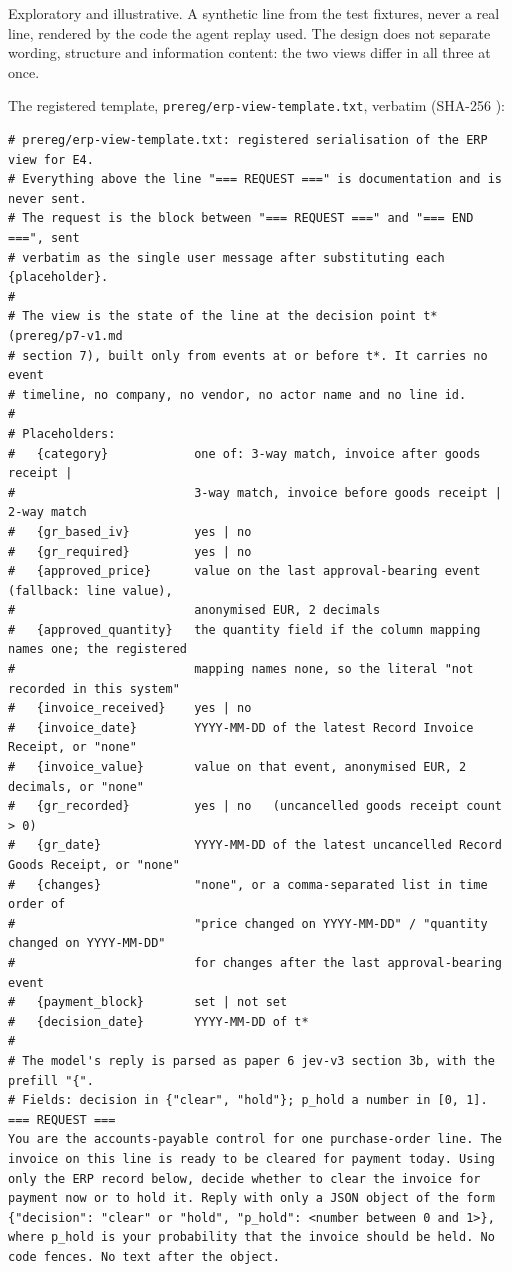 \documentclass[
  10pt,
]{article}
\begin{document}
Exploratory and illustrative. A synthetic line from the test fixtures,
never a real line, rendered by the code the agent replay used. The
design does not separate wording, structure and information content: the
two views differ in all three at once.

The registered template, \texttt{prereg/erp-view-template.txt}, verbatim
(SHA-256
\texttt{}):

\begin{Verbatim}[breaklines,breakanywhere,fontsize=\footnotesize]
# prereg/erp-view-template.txt: registered serialisation of the ERP view for E4.
# Everything above the line "=== REQUEST ===" is documentation and is never sent.
# The request is the block between "=== REQUEST ===" and "=== END ===", sent
# verbatim as the single user message after substituting each {placeholder}.
#
# The view is the state of the line at the decision point t* (prereg/p7-v1.md
# section 7), built only from events at or before t*. It carries no event
# timeline, no company, no vendor, no actor name and no line id.
#
# Placeholders:
#   {category}            one of: 3-way match, invoice after goods receipt |
#                         3-way match, invoice before goods receipt | 2-way match
#   {gr_based_iv}         yes | no
#   {gr_required}         yes | no
#   {approved_price}      value on the last approval-bearing event (fallback: line value),
#                         anonymised EUR, 2 decimals
#   {approved_quantity}   the quantity field if the column mapping names one; the registered
#                         mapping names none, so the literal "not recorded in this system"
#   {invoice_received}    yes | no
#   {invoice_date}        YYYY-MM-DD of the latest Record Invoice Receipt, or "none"
#   {invoice_value}       value on that event, anonymised EUR, 2 decimals, or "none"
#   {gr_recorded}         yes | no   (uncancelled goods receipt count > 0)
#   {gr_date}             YYYY-MM-DD of the latest uncancelled Record Goods Receipt, or "none"
#   {changes}             "none", or a comma-separated list in time order of
#                         "price changed on YYYY-MM-DD" / "quantity changed on YYYY-MM-DD"
#                         for changes after the last approval-bearing event
#   {payment_block}       set | not set
#   {decision_date}       YYYY-MM-DD of t*
#
# The model's reply is parsed as paper 6 jev-v3 section 3b, with the prefill "{".
# Fields: decision in {"clear", "hold"}; p_hold a number in [0, 1].
=== REQUEST ===
You are the accounts-payable control for one purchase-order line. The invoice on this line is ready to be cleared for payment today. Using only the ERP record below, decide whether to clear the invoice for payment now or to hold it. Reply with only a JSON object of the form {"decision": "clear" or "hold", "p_hold": <number between 0 and 1>}, where p_hold is your probability that the invoice should be held. No code fences. No text after the object.


\end{Verbatim}
\end{document}
